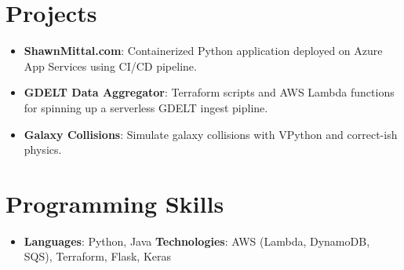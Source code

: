 \documentclass[letterpaper,11pt]{article}
\newcommand{\resumeItem}[2]{
  \item\small{
    \textbf{#1}{: #2 \vspace{-2pt}}
  }
}
\newcommand{\resumeSubItem}[2]{\resumeItem{#1}{#2}\vspace{-4pt}}
\newcommand{\resumeSubHeadingListStart}{\begin{itemize}[leftmargin=*]}
\newcommand{\resumeSubHeadingListEnd}{\end{itemize}}
\begin{document}
\section{Projects}
  \resumeSubHeadingListStart
    \resumeSubItem{ShawnMittal.com}
      {Containerized Python application deployed on Azure App Services using CI/CD pipeline.}
    \resumeSubItem{GDELT Data Aggregator}
      {Terraform scripts and AWS Lambda functions for spinning up a serverless GDELT ingest pipline.}
    \resumeSubItem{Galaxy Collisions}
      {Simulate galaxy collisions with VPython and correct-ish physics.}
  \resumeSubHeadingListEnd


\section{Programming Skills}
  \resumeSubHeadingListStart
    \item{
      \textbf{Languages}{: Python, Java}
      \hfill
      \textbf{Technologies}{: AWS (Lambda, DynamoDB, SQS), Terraform, Flask, Keras}
    }
  \resumeSubHeadingListEnd


\end{document}
